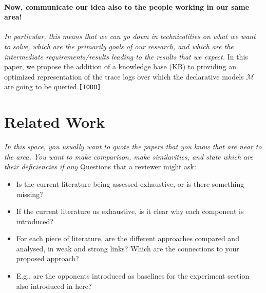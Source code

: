 \documentclass[11pt]{article}
\begin{document}
\paragraph*{Now, communicate our idea also to the people working in our same area!} \textit{In particular, this means that we can go down in technicalities on what we want to solve, which are the primarily goals of our research, and which are the intermediate requirements/results leading to the results that we expect.} 
 In this paper, we propose the addition of a knowledge base (KB) to providing an optimized representation of the trace logs over which the declarative models $\mathcal{M}$ are going to be queried.\texttt{\color{red}[TODO]} %
 
 



\section{Related Work}
\textit{In this space, you usually want to quote the papers that you know that are near to the area. You want to make comparison, make similarities, and state which are their deficiencies if any} Questions that a reviewer might ask:
\begin{itemize}
	\item Is the current literature being assessed exhaustive, or is there something missing?
	\item If the current literature us exhaustive, is it clear why each component is introduced?
	\item For each piece of literature, are the different approaches compared and analysed, in weak and strong links? Which are the connections to your proposed approach?
	\item E.g., are the opponents introduced as baselines for the experiment section also introduced in here?
\end{itemize}

\end{document}
